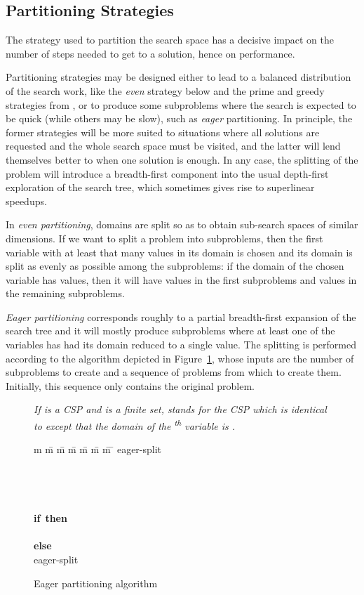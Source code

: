 \documentclass{llncs}
\newenvironment{notation}{\trivlist\item[\hskip \labelsep{\bfseries Notation}]\itshape}{\endtrivlist}
\newcommand{\IF}{\textbf{\sffamily if}}
\newcommand{\THEN}{\textbf{\sffamily then}}
\newcommand{\ELSE}{\textbf{\sffamily else}}
\begin{document}
\subsection{Partitioning Strategies}

The strategy used to partition the search space has a decisive impact
on the number of steps needed to get to a solution, hence on
performance.

Partitioning strategies may be designed either to lead to a balanced
distribution of the search work, like the \emph{even} strategy below
and the prime and greedy strategies from \cite{pas-silaghi01}, or to
produce some subproblems where the search is expected to be quick
(while others may be slow), such as \emph{eager} partitioning. In
principle, the former strategies will be more suited to situations
where all solutions are requested and the whole search space must be
visited, and the latter will lend themselves better to when one
solution is enough. In any case, the splitting of the problem will
introduce a breadth-first component into the usual depth-first
exploration of the search tree, which sometimes gives rise to
superlinear speedups.

In \emph{even partitioning}, domains are split so as to obtain
sub-search spaces of similar dimensions. If we want to split a problem
into  subproblems, then the first variable with at least that many
values in its domain is chosen and its domain is split as evenly as
possible among the subproblems: if the domain of the chosen variable
has  values, then it will have  values
in the first  subproblems and  values in the remaining 
subproblems.

\emph{Eager partitioning} corresponds roughly to a partial
breadth-first expansion of the search tree and it will mostly produce
subproblems where at least one of the variables has had its domain
reduced to a single value. The splitting is performed according to the
algorithm depicted in Figure~\ref{algo:eager}, whose inputs are the
number of subproblems to create and a sequence of problems from which
to create them. Initially, this sequence only contains the original
problem.

\begin{figure}[ht]
  {
    \normalsize
    \begin{notation}
      If  is a CSP and  is a finite set,  stands for the
      CSP which is identical to  except that the domain of the
      \textsuperscript{th} variable is .
    \end{notation}
  }
  {
    \sffamily
    \begin{tabbing}
      m \= m \= m \= m \= m \= m \= m \= \kill
      eager-split \+ \\
       \\
       \\
       \\
       \\
      \IF\  \THEN \+ \\
         \- \\
      \ELSE \+ \\
        eager-split
    \end{tabbing}
  }
  \caption{Eager partitioning algorithm}
  \label{algo:eager}
\end{figure}
\end{document}
